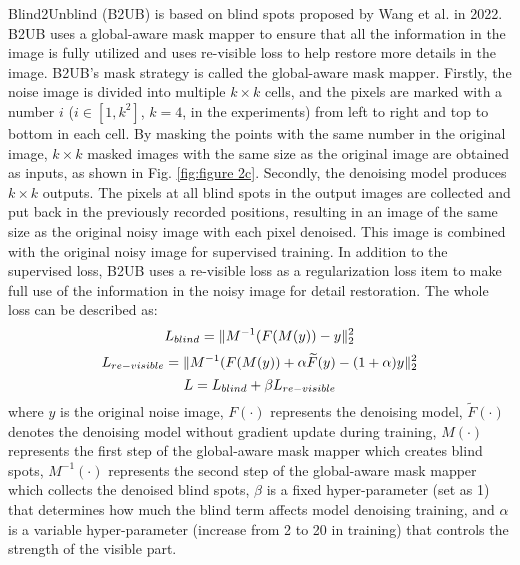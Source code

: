 \documentclass[conference]{IEEEtran}
\begin{document}
Blind2Unblind (B2UB) \cite{wang2022blind2unblind} is based on blind spots proposed by Wang et al. in 2022. B2UB uses a global-aware mask mapper to ensure that all the information in the image is fully utilized and uses re-visible loss to help restore more details in the image.
B2UB’s mask strategy is called the global-aware mask mapper. Firstly, the noise image is divided into multiple $k\times k$ cells, and the pixels are marked with a number $i$ ($i \in [1,k^2]$, $k=4$, in the experiments) from left to right and top to bottom in each cell. By masking the points with the same number in the original image, $k\times k$ masked images with the same size as the original image are obtained as inputs, as shown in Fig. \ref{fig:figure 2c}. Secondly, the denoising model produces $k\times k$ outputs. The pixels at all blind spots in the output images are collected and put back in the previously recorded positions, resulting in an image of the same size as the original noisy image with each pixel denoised. This image is combined with the original noisy image for supervised training.
In addition to the supervised loss, B2UB uses a re-visible loss as a regularization loss item to make full use of the information in the noisy image for detail restoration. The whole loss can be described as:
\begin{equation}
	\setlength{\abovedisplayskip}{0pt}
	\setlength{\belowdisplayskip}{0pt}
	L_{blind} = \Vert M^{-1}(F(M(y)) - y \Vert_{2}^{2}
	\label{eq:B2UB_1}
\end{equation}
\begin{equation}
	\setlength{\abovedisplayskip}{0pt}
	\setlength{\belowdisplayskip}{0pt}
	L_{re-visible} = \Vert M^{-1}(F(M(y)) + \alpha \widetilde{F}(y) -(1 + \alpha)y \Vert_{2}^{2}
	\label{eq:B2UB_2}
\end{equation}
\begin{equation}
	\setlength{\abovedisplayskip}{0pt}
	\setlength{\belowdisplayskip}{0pt}
	L = L_{blind} + \beta L_{re-visible}
	\label{eq:B2UB_3}
\end{equation}
where $y$ is the original noise image, $F(\cdot)$ represents the denoising model, $\tilde{F}(\cdot)$ denotes the denoising model without gradient update during training, $M(\cdot)$ represents the first step of the global-aware mask mapper which creates blind spots, $M^{-1} (\cdot)$ represents the second step of the global-aware mask mapper which collects the denoised blind spots, $\beta$ is a fixed hyper-parameter (set as 1) that determines how much the blind term affects model denoising training, and $\alpha$ is a variable hyper-parameter (increase from 2 to 20 in training) that controls the strength of the visible part.
\end{document}
